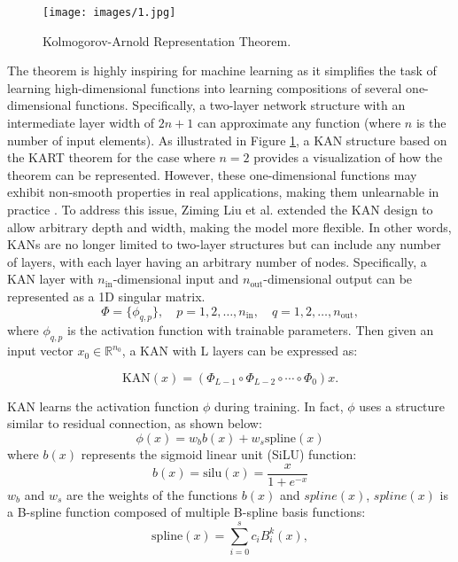 \documentclass{article}
\begin{document}
\begin{figure}[ht]
\centering
\texttt{[image: images/1.jpg]}
\caption{Kolmogorov-Arnold Representation Theorem.}
\label{fig:KART}
\end{figure}

The theorem is highly inspiring for machine learning as it simplifies the task of learning high-dimensional functions into learning compositions of several one-dimensional functions. Specifically, a two-layer network structure with an intermediate layer width of $2n+1$ can approximate any function (where $n$ is the number of input elements). As illustrated in Figure \ref{fig:KART}, a KAN structure based on the KART theorem for the case where $n=2$ provides a visualization of how the theorem can be represented. However, these one-dimensional functions may exhibit non-smooth properties in real applications, making them unlearnable in practice \parencite{poggio2020theoretical}. To address this issue, Ziming Liu et al. \parencite{liu2024kankolmogorovarnoldnetworks}  extended the KAN design to allow arbitrary depth and width, making the model more flexible. In other words, KANs are no longer limited to two-layer structures but can include any number of layers, with each layer having an arbitrary number of nodes. Specifically, a KAN layer with $n_{\text{in}}$-dimensional input and $n_{\text{out}}$-dimensional output can be represented as a 1D singular matrix.
\begin{equation}
\Phi = \{\phi_{q,p}\}, \quad p = 1, 2, \dots, n_{\text{in}}, \quad q = 1, 2, \dots, n_{\text{out}},
\end{equation}
where \(\phi_{q,p}\) is the activation function with trainable parameters.
Then given an input vector \(x_0 \in \mathbb{R}^{n_0}\), a KAN with L layers can be expressed as:

\begin{equation}
\text{KAN}(x) = (\Phi_{L-1} \circ \Phi_{L-2} \circ \cdots \circ \Phi_0)x.
\end{equation}

KAN learns the activation function \(\phi\) during training. In fact, \(\phi\) uses a structure similar to residual connection, as shown below:
\begin{equation}
\phi(x) = w_b b(x) + w_s \text{spline}(x)
\end{equation}
where \(b(x)\) represents the sigmoid linear unit (SiLU) function:
\begin{equation}
b(x) = \text{silu}(x) = \frac{x}{1 + e^{-x}}
\end{equation}
\( w_b \) and \( w_s \) are the weights of the functions \(b(x)\) and \(spline(x)\), \(spline(x)\) is a B-spline function composed of multiple B-spline basis functions:
\begin{equation}
\text{spline}(x) = \sum_{i=0}^{s} c_i B_i^k(x),
\end{equation}
\end{document}
